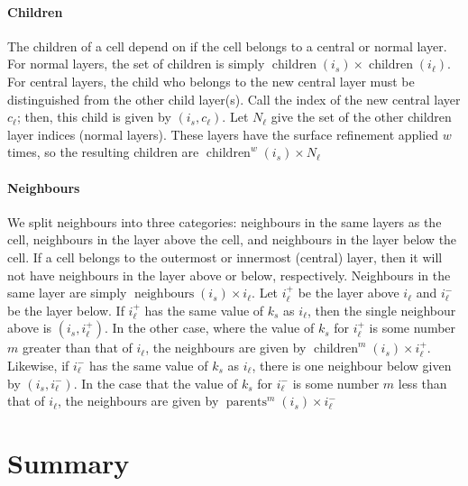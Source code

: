 \paragraph{Children} The children of a cell depend on if the cell belongs to a central or normal layer.
For normal layers, the set of children is simply $\operatorname{children}(i_s) \times \operatorname{children}(i_\ell)$.
For central layers, the child who belongs to the new central layer must be distinguished from the other child layer(s).
Call the index of the new central layer $c_\ell$; then, this child is given by $(i_s, c_\ell)$.
Let $ N_\ell$ give the set of the other children layer indices (normal layers).
These layers have the surface refinement applied $w$ times, so the resulting children are $\operatorname{children}^w(i_s) \times N_\ell$


\paragraph{Neighbours} We split neighbours into three categories: neighbours in the same layers as the cell, neighbours in the layer above the cell, and neighbours in the layer below the cell.
If a cell belongs to the outermost or innermost (central) layer, then it will not have neighbours in the layer above or below, respectively.
Neighbours in the same layer are simply $\operatorname{neighbours}(i_s) \times i_\ell$.
Let $i_\ell^+$ be the layer above $i_\ell$ and $i_\ell^-$ be the layer below.
If $i_\ell^+$ has the same value of $k_s$ as $i_\ell$, then the single neighbour above is $(i_s, i_\ell^+)$.
In the other case, where the value of $k_s$ for $i_\ell^+$ is some number $m$ greater than that of $i_\ell$, the neighbours are given by $\operatorname{children}^m(i_s) \times i_\ell^+$.
Likewise, if $i_\ell^-$ has the same value of $k_s$ as $i_\ell$, there is one neighbour below given by $(i_s, i_\ell^-)$.
In the case that the value of $k_s$ for $i_\ell^-$ is some number $m$ less than that of $i_\ell$, the neighbours are given by $\operatorname{parents}^m(i_s) \times i_\ell^-$

\section{Summary}
